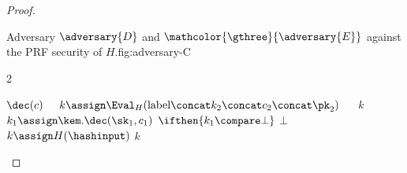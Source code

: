 \begin{proof}
\begin{gamefigure}{Adversary $\adversary{D}$ and $\mathcolor{\gthree}{\adversary{E}}$ against the PRF security of $H$.}{fig:adversary-C}
\begin{games}{2}
\begin{gameenv}{\oracle $\dec(c)$}
                                                    \State $\quad k \assign \Eval_{H}(\text{label} \concat k_2 \concat c_2 \concat \pk_2)$
                                                    \State $\quad$ \Return $k$
                                                    \State $k_1 \assign \kem.\dec(\sk_1,c_1)$
                                                    \State $\ifthen{k_1 \compare \bot}$
                                                        \State \quad \Return $\bot$
                                                        \State $k \assign H(\hashinput)$
                                                        \State \Return $k$
                                                    \end{gameenv}
                                                \end{games}
                                            \end{gamefigure}
                                        \end{proof}
